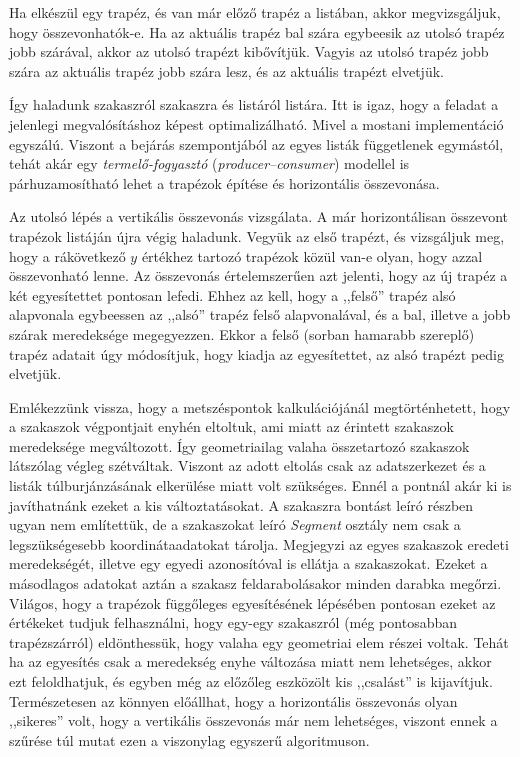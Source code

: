 \documentclass[12pt]{report}
\theoremstyle{definition}
\newcommand{\inenglish}[1]{\textsl{#1}}
\newcommand{\func}[1]{{\textsl{#1}}}
\begin{document}
Ha elkészül egy trapéz, és van már előző trapéz a listában, akkor
megvizsgáljuk, hogy összevonhatók-e. Ha az aktuális trapéz bal szára egybeesik
az utolsó trapéz jobb szárával, akkor az utolsó trapézt kibővítjük. Vagyis az
utolsó trapéz jobb szára az aktuális trapéz jobb szára lesz, és az aktuális
trapézt elvetjük.

Így haladunk szakaszról szakaszra és listáról listára. Itt is igaz, hogy a
feladat a jelenlegi megvalósításhoz képest optimalizálható. Mivel a mostani
implementáció egyszálú. Viszont a bejárás szempontjából az egyes listák
függetlenek egymástól, tehát akár egy \emph{termelő-fogyasztó}
(\inenglish{producer--consumer}) modellel is párhuzamosítható lehet a trapézok
építése és horizontális összevonása.

Az utolsó lépés a vertikális összevonás vizsgálata. A már horizontálisan
összevont trapézok listáján újra végig haladunk. Vegyük az első trapézt, és
vizsgáljuk meg, hogy a rákövetkező $y$ értékhez tartozó trapézok közül van-e
olyan, hogy azzal összevonható lenne. Az összevonás értelemszerűen azt jelenti,
hogy az új trapéz a két egyesítettet pontosan lefedi. Ehhez az kell, hogy a
,,felső'' trapéz alsó alapvonala egybeessen az ,,alsó'' trapéz felső
alapvonalával, és a bal, illetve a jobb szárak meredeksége megegyezzen. Ekkor a
felső (sorban hamarabb szereplő) trapéz adatait úgy módosítjuk, hogy kiadja az
egyesítettet, az alsó trapézt pedig elvetjük.

Emlékezzünk vissza, hogy a metszéspontok kalkulációjánál megtörténhetett, hogy
a szakaszok végpontjait enyhén eltoltuk, ami miatt az érintett szakaszok
meredeksége megváltozott. Így geometriailag valaha összetartozó szakaszok
látszólag végleg szétváltak. Viszont az adott eltolás csak az adatszerkezet és
a listák túlburjánzásának elkerülése miatt volt szükséges. Ennél a pontnál akár
ki is javíthatnánk ezeket a kis változtatásokat. A szakaszra bontást leíró
részben ugyan nem említettük, de a szakaszokat leíró \func{Segment} osztály nem
csak a legszükségesebb koordinátaadatokat tárolja. Megjegyzi az egyes szakaszok
eredeti meredekségét, illetve egy egyedi azonosítóval is ellátja a szakaszokat.
Ezeket a másodlagos adatokat aztán a szakasz feldarabolásakor minden darabka
megőrzi. Világos, hogy a trapézok függőleges egyesítésének lépésében pontosan
ezeket az értékeket tudjuk felhasználni, hogy egy-egy szakaszról (még
pontosabban trapézszárról) eldönthessük, hogy valaha egy geometriai elem részei
voltak. Tehát ha az egyesítés csak a meredekség enyhe változása miatt nem
lehetséges, akkor ezt feloldhatjuk, és egyben még az előzőleg eszközölt kis
,,csalást'' is kijavítjuk. Természetesen az könnyen előállhat, hogy a
horizontális összevonás olyan ,,sikeres'' volt, hogy a vertikális összevonás
már nem lehetséges, viszont ennek a szűrése túl mutat ezen a viszonylag
egyszerű algoritmuson.
\end{document}
